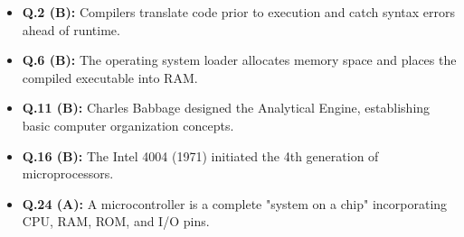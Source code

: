 \begin{expbox}
\begin{itemize}[leftmargin=5mm]
    \item \textbf{Q.2 (B):} Compilers translate code prior to execution and catch syntax errors ahead of runtime.
    \item \textbf{Q.6 (B):} The operating system loader allocates memory space and places the compiled executable into RAM.
    \item \textbf{Q.11 (B):} Charles Babbage designed the Analytical Engine, establishing basic computer organization concepts.
    \item \textbf{Q.16 (B):} The Intel 4004 (1971) initiated the 4th generation of microprocessors.
    \item \textbf{Q.24 (A):} A microcontroller is a complete "system on a chip" incorporating CPU, RAM, ROM, and I/O pins.
\end{itemize}
\end{expbox}

\newpage
